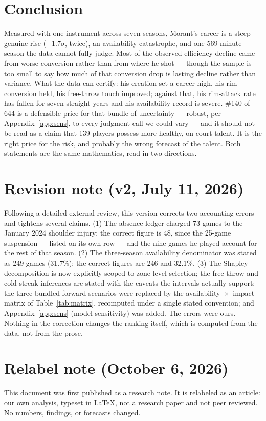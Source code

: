 \documentclass[11pt]{article}
\begin{document}
\section{Conclusion}

Measured with one instrument across seven seasons, Morant's career is a steep genuine
rise ($+1.7\sigma$, twice), an availability catastrophe, and one 569-minute season the
data cannot fully judge. Most of the observed efficiency decline came from worse
conversion rather than from where he shot --- though the sample is too small to say how
much of that conversion drop is lasting decline rather than variance. What the data can
certify: his creation set a career high, his rim conversion held, his free-throw touch
improved; against that, his rim-attack rate has fallen for seven straight years and his
availability record is severe. \#140 of 644 is a defensible price for that bundle of
uncertainty --- robust, per Appendix~\ref{app:sens}, to every judgment call we could
vary --- and it should not be read as a claim that 139 players possess more healthy,
on-court talent. It is the right price for the risk, and probably the wrong forecast of
the talent. Both statements are the same mathematics, read in two directions.

\section*{Revision note (v2, July 11, 2026)}
Following a detailed external review, this version corrects two accounting errors and
tightens several claims. (1) The absence ledger charged 73 games to the January 2024
shoulder injury; the correct figure is 48, since the 25-game suspension --- listed on
its own row --- and the nine games he played account for the rest of that season.
(2) The three-season availability denominator was stated as 249 games (31.7\%); the
correct figures are 246 and 32.1\%. (3) The Shapley decomposition is now explicitly
scoped to zone-level selection; the free-throw and cold-streak inferences are stated
with the caveats the intervals actually support; the three bundled forward scenarios
were replaced by the availability~$\times$~impact matrix of Table~\ref{tab:matrix},
recomputed under a single stated convention; and Appendix~\ref{app:sens} (model
sensitivity) was added. The errors were ours. Nothing in the correction changes the
ranking itself, which is computed from the data, not from the prose.

\section*{Relabel note (October 6, 2026)}
This document was first published as a research note. It is relabeled as an article: our own
analysis, typeset in \LaTeX, not a research paper and not peer reviewed. No numbers, findings, or
forecasts changed.
\end{document}
